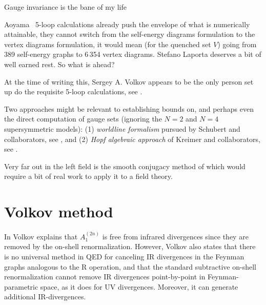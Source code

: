 \begin{bartlett}{
{Gauge invariance is the bane of my life}
        }
\end{bartlett}
\bigskip

\noindent
Aoyama \etal\ 5-loop calculations already push the envelope of what is
numerically attainable, they cannot switch from the self-energy
diagrams formulation to the vertex diagrams formulation, it would mean
(for the quenched set $V$) going from 389 self-energy graphs to 6\,354
vertex diagrams. Stefano Laporta deserves a bit of well earned rest. So
what is ahead?

At the time of writing this, Sergey  A. Volkov appears to be the
only person set up do the requisite 5-loop calculations,
see .

Two approaches might be relevant to
establishing bounds on, and perhaps even the direct computation
of gauge sets (ignoring the $N\!=\!2$ and $N\!=\!4$
supersymmetric models):
(1)
\emph{worldline formalism} pursued by
{Schubert} and collaborators,
see ,
and
(2)
\emph{Hopf algebraic approach} of Kreimer and collaborators,
see .

Very far out in the left field is the smooth conjugacy method of
 which would require a bit of real work to apply it
to a field theory.



\section{Volkov method}
\label{sect:Volkov}

In  Volkov explains that $A_1^{(2n)}$ is free from
infrared divergences since they are removed by the on-shell
renormalization.
However, Volkov also states that there is no universal method in QED for
canceling IR divergences in the Feynman graphs analogous to the R
operation, and that the standard subtractive on-shell renormalization
cannot remove IR divergences point-by-point in Feynman-parametric space,
as it does for UV divergences. Moreover, it can generate additional
IR-divergences.

